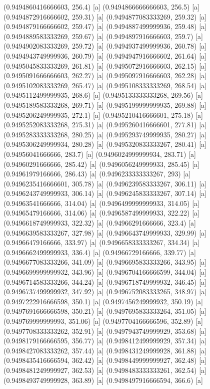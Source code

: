 {{{(0.9494860416666603, 256.4) [a] 
(0.9494866666666603, 256.5) [a] 
(0.9494872916666602, 259.31) [a] 
(0.9494877083333269, 259.32) [a] 
(0.9494879166666602, 259.47) [a] 
(0.9494887499999936, 259.48) [a] 
(0.9494889583333269, 259.67) [a] 
(0.9494897916666603, 259.7) [a] 
(0.9494902083333269, 259.72) [a] 
(0.9494937499999936, 260.78) [a] 
(0.9494943749999936, 260.79) [a] 
(0.9494947916666602, 261.64) [a] 
(0.9495045833333269, 261.81) [a] 
(0.9495072916666603, 262.15) [a] 
(0.9495091666666603, 262.27) [a] 
(0.9495097916666603, 262.28) [a] 
(0.9495102083333269, 265.47) [a] 
(0.9495108333333269, 268.54) [a] 
(0.9495112499999935, 268.6) [a] 
(0.9495133333333268, 269.56) [a] 
(0.9495189583333268, 269.71) [a] 
(0.9495199999999935, 269.88) [a] 
(0.9495206249999935, 272.1) [a] 
(0.9495210416666601, 275.18) [a] 
(0.9495252083333268, 275.31) [a] 
(0.9495260416666601, 277.81) [a] 
(0.9495283333333268, 280.25) [a] 
(0.9495293749999935, 280.27) [a] 
(0.9495306249999934, 280.28) [a] 
(0.9495320833333267, 280.41) [a] 
(0.94956041666666, 283.7) [a] 
(0.9496024999999934, 283.71) [a] 
(0.94960291666666, 285.42) [a] 
(0.9496056249999933, 285.45) [a] 
(0.94961979166666, 286.43) [a] 
(0.9496233333333267, 293) [a] 
(0.9496235416666601, 305.78) [a] 
(0.9496239583333267, 306.11) [a] 
(0.9496243749999933, 306.14) [a] 
(0.9496245833333267, 307.14) [a] 
(0.94963541666666, 314.04) [a] 
(0.9496499999999933, 314.05) [a] 
(0.94965479166666, 314.06) [a] 
(0.9496587499999933, 322.22) [a] 
(0.9496618749999933, 322.32) [a] 
(0.94966291666666, 323.4) [a] 
(0.9496639583333267, 327.98) [a] 
(0.9496643749999933, 329.99) [a] 
(0.94966479166666, 333.97) [a] 
(0.9496658333333267, 334.34) [a] 
(0.9496662499999933, 336.4) [a] 
(0.94966729166666, 339.77) [a] 
(0.9496677083333266, 341.09) [a] 
(0.9496695833333266, 343.95) [a] 
(0.9496699999999932, 343.96) [a] 
(0.9496704166666599, 344.04) [a] 
(0.9496714583333266, 344.24) [a] 
(0.9496718749999932, 346.45) [a] 
(0.9496737499999932, 347.92) [a] 
(0.9496752083333265, 348.97) [a] 
(0.9497222916666598, 350.1) [a] 
(0.9497456249999932, 350.19) [a] 
(0.9497691666666598, 350.21) [a] 
(0.9497695833333264, 351.05) [a] 
(0.949769999999993, 351.06) [a] 
(0.9497704166666596, 352.89) [a] 
(0.9497708333333262, 352.91) [a] 
(0.9497943749999929, 353.68) [a] 
(0.9498179166666595, 356.77) [a] 
(0.9498412499999929, 357.34) [a] 
(0.9498427083333262, 357.44) [a] 
(0.9498431249999928, 361.88) [a] 
(0.9498435416666594, 362.42) [a] 
(0.9498449999999927, 362.48) [a] 
(0.9498481249999927, 362.53) [a] 
(0.9498483333333261, 362.54) [a] 
(0.9498493749999928, 363.89) [a] 
(0.9498497916666594, 366.6) [a] 
}}}
